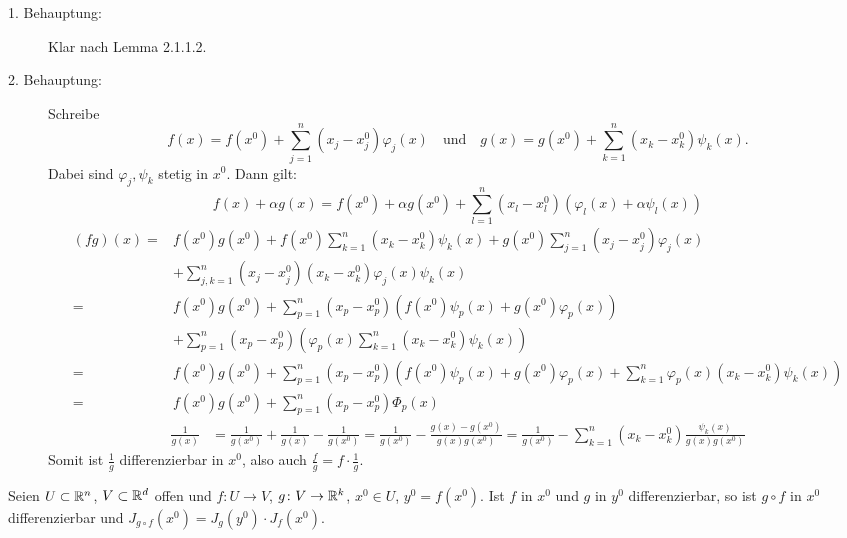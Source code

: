 \begin{beweis}
	\begin{description}
		\item[1. Behauptung:] Klar nach Lemma 2.1.1.2.
		\item[2. Behauptung:] Schreibe
		\[ f(x)=f(x^0)+\sum_{j=1}^{n}(x_j-x_j^0)\varphi_j(x)\quad\text{und}\quad g(x)=g(x^0)+\sum_{k=1}^{n}(x_k-x_k^0)\psi_k(x). \]
		Dabei sind $ \varphi_j, \psi_k $ stetig in $ x^0 $. Dann gilt:
		\[ f(x)+\alpha g(x)=f(x^0)+\alpha g(x^0)+\sum_{l=1}^n (x_l-x_l^0)(\varphi_l(x)+\alpha \psi_l(x)) \]
		\begin{align*} (fg)(x)=&f(x^0)g(x^0)+f(x^0)\sum_{k=1}^n(x_k-x_k^0)\psi_k(x)+g(x^0)\sum_{j=1}^{n}(x_j-x_j^0)\varphi_j(x)\\&+\sum_{j,k=1}^n(x_j-x_j^0)(x_k-x_k^0)\varphi_j(x)\psi_k(x)\\
		=&f(x^0)g(x^0)+\sum_{p=1}^n(x_p-x_p^0)(f(x^0)\psi_p(x)+g(x^0)\varphi_p(x))\\
		&+\sum_{p=1}^{n}(x_p-x_p^0)\left(\varphi_p(x)\sum_{k=1}^{n}(x_k-x_k^0)\psi_k(x)\right)\\
		=&f(x^0)g(x^0)+\sum_{p=1}^{n}(x_p-x_p^0)\left(f(x^0)\psi_p(x)+g(x^0)\varphi_p(x)+\sum_{k=1}^{n}\varphi_p(x)(x_k-x_k^0)\psi_k(x)\right)\\
		=&f(x^0)g(x^0)+\sum_{p=1}^{n}(x_p-x_p^0)\Phi_p(x) \end{align*}
		\begin{align*}
		\frac{1}{g(x)}&=\frac{1}{g(x^0)}+\frac{1}{g(x)}-\frac{1}{g(x^0)}=\frac{1}{g(x^0)}-\frac{g(x)-g(x^0)}{g(x)g(x^0)}=\frac{1}{g(x^0)}-\sum_{k=1}^{n}(x_k-x_k^0)\frac{\psi_k(x)}{g(x)g(x^0)}
		\end{align*}
		Somit ist $ \frac{1}{g} $ differenzierbar in $ x^0 $, also auch $ \frac{f}{g}=f\cdot\frac{1}{g} $. 
	\end{description}
\end{beweis}
\begin{satz}[Kettenregel]
	Seien $ U\subset\mathbb{R}^n $, $ V\subset\mathbb{R}^d $ offen und $ f\colon U\rightarrow V $, $ g\colon V\rightarrow\mathbb{R}^k $, $ x^0\in U $, $ y^0=f(x^0) $. Ist $ f $ in $ x^0 $ und $ g $ in $ y^0 $ differenzierbar, so ist $ g\circ f $ in $ x^0 $ differenzierbar und $ J_{g\circ f}(x^0)=J_g(y^0)\cdot J_f(x^0) $.
\end{satz}
\newpage
